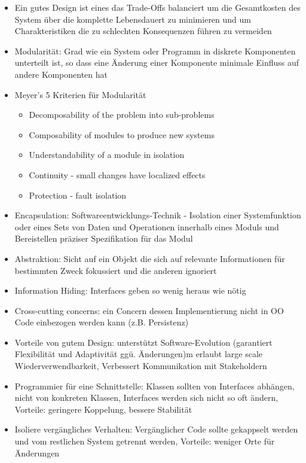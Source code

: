 \documentclass[paper=a4, fontsize=11pt]{scrartcl} %
\numberwithin{equation}{section} %
\numberwithin{figure}{section} %
\numberwithin{table}{section} %
\begin{document}
\begin{itemize}
\begin{itemize}
    \item Ein gutes Design ist eines das Trade-Offs balanciert um die Gesamtkosten des System über die komplette Lebensdauert zu minimieren und um Charakteristiken die zu schlechten Konsequenzen führen zu vermeiden
    \item Modularität: Grad wie ein System oder Programm in diskrete Komponenten unterteilt ist, so dass eine Änderung einer Komponente minimale Einfluss auf andere Komponenten hat
    \item Meyer's 5 Kriterien für Modularität
    \begin{itemize}
      \item Decomposability of the problem into sub-problems
      \item Composability of modules to produce new systems
      \item Understandability of a module in isolation
      \item Continuity - small changes have localized effects
      \item Protection - fault isolation
    \end{itemize}
    \item Encapsulation: Softwareentwicklungs-Technik - Isolation einer Systemfunktion oder eines Sets von Daten und Operationen innerhalb eines Moduls und Bereistellen präziser Spezifikation für das Modul
    \item Abstraktion: Sicht auf ein Objekt die sich auf relevante Informationen für bestimmten Zweck fokussiert und die anderen ignoriert
    \item Information Hiding: Interfaces geben so wenig heraus wie nötig
    \item Cross-cutting concerns: ein Concern dessen Implementierung nicht in OO Code einbezogen werden kann (z.B. Persistenz)
    \item Vorteile von gutem Design: unterstützt Software-Evolution (garantiert Flexibilität und Adaptivität ggü. Änderungen)m erlaubt large scale Wiederverwendbarkeit, Verbessert Kommunikation mit Stakeholdern
    \item Programmier für eine Schnittstelle: Klassen sollten von Interfaces abhängen, nicht von konkreten Klassen, Interfaces werden sich nicht so oft ändern, Vorteile: geringere Koppelung, bessere Stabilität
    \item Isoliere vergängliches Verhalten: Vergänglicher Code sollte gekappselt werden und vom restlichen System getrennt werden, Vorteile: weniger Orte für Änderungen
  \end{itemize}

\end{itemize}
\end{document}
